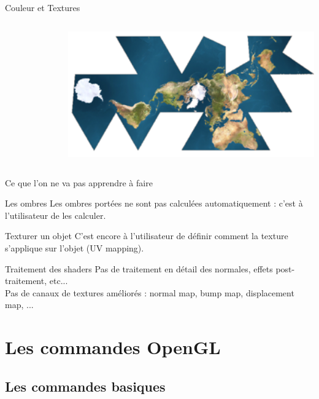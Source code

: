 \documentclass{beamer}
\begin{document}
\begin{frame}{Couleur et Textures}
\begin{columns}
\begin{column}{0.4\textwidth}
		\end{column}
		\begin{column}{0.6\textwidth}
			\centering
			\includegraphics[width=1\textwidth]{img/uv_map}
		\end{column}
	\end{columns}
\end{frame}

\begin{frame}{Ce que l'on ne va pas apprendre à faire}
	\begin{alertblock}{Les ombres}
		Les ombres portées ne sont pas calculées automatiquement : c'est à l'utilisateur de les calculer.
	\end{alertblock}
	\begin{alertblock}{Texturer un objet}
		C'est encore à l'utilisateur de définir comment la texture s'applique sur l'objet (UV mapping).
	\end{alertblock}
	\begin{alertblock}{Traitement des shaders}
		Pas de traitement en détail des normales, effets post-traitement, etc... \\
		Pas de canaux de textures améliorés : normal map, bump map, displacement map, ...
	\end{alertblock}
\end{frame}


\section{Les commandes OpenGL}

\subsection{Les commandes basiques}
\end{document}
